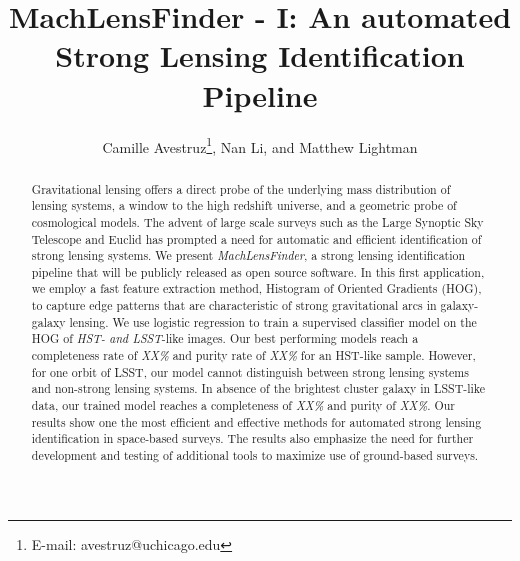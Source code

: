 \documentclass{emulateapj}
\newcommand{\change}[1]{{\it\color{purple} #1}}
\begin{document}
 

\title{MachLensFinder - I: An automated Strong Lensing
  Identification Pipeline}

\author{Camille Avestruz\thanks{E-mail:
    avestruz@uchicago.edu}, Nan Li, and Matthew Lightman }


  
\begin{abstract} 
Gravitational lensing offers a direct probe of the underlying mass
distribution of lensing systems, a window to the high redshift
universe, and a geometric probe of cosmological models.  The advent of
large scale surveys such as the Large Synoptic Sky Telescope and
Euclid has prompted a need for automatic and efficient identification
of strong lensing systems.  We present {\em MachLensFinder}, a
strong lensing identification pipeline that will be publicly released
as open source software.  In this first application, we employ a fast
feature extraction method, Histogram of Oriented Gradients (HOG), to
capture edge patterns that are characteristic of strong gravitational
arcs in galaxy-galaxy lensing.  We use logistic regression to train a
supervised classifier model on the HOG of \change{HST- and LSST}-like
images.  Our best performing models reach a completeness rate of
\change{XX\%} and purity rate of \change{XX\%} for an HST-like sample.
However, for one orbit of LSST, our model cannot distinguish between
strong lensing systems and non-strong lensing systems.  In absence of
the brightest cluster galaxy in LSST-like data, our trained model
reaches a completeness of \change{XX\%} and purity of \change{XX\%}.
Our results show one the most efficient and effective methods for
automated strong lensing identification in space-based surveys.  The
results also emphasize the need for further development and testing of
additional tools to maximize use of ground-based surveys.
\end{abstract}
\end{document}
